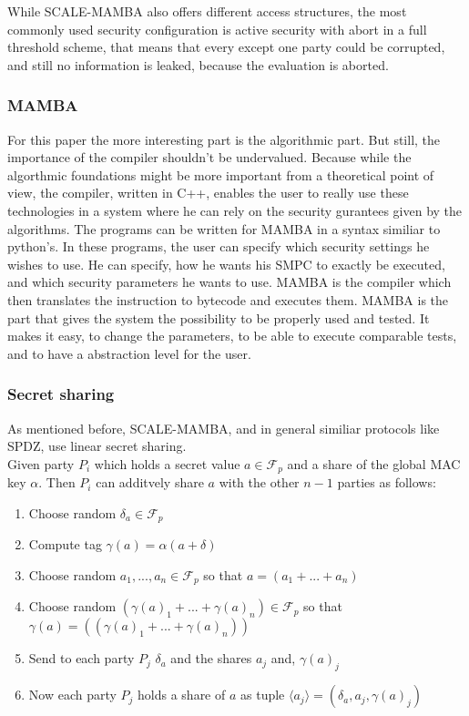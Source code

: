 \documentclass[english,runningheads,a4paper]{llncs}[2018/03/10]
\begin{document}
While SCALE-MAMBA also offers different access structures, the most commonly used security configuration is active security with abort in a full threshold scheme, that means that every except one party could be corrupted, and still no information is leaked, because the evaluation is aborted.

\subsubsection{MAMBA}
For this paper the more interesting part is the algorithmic part. But still, the importance of the compiler shouldn't be undervalued. Because while the algorthmic foundations might be more important from a theoretical point of view, the compiler, written in C++, enables the user to really use these technologies in a system where he can rely on the security gurantees given by the algorithms. The programs can be written for MAMBA in a syntax similiar to python's. In these programs, the user can specify which security settings he wishes to use. He can specify, how he wants his SMPC to exactly be executed, and which security parameters he wants to use. MAMBA is the compiler which then translates the instruction to bytecode and executes them. MAMBA is the part that gives the system the possibility to be properly used and tested. It makes it easy, to change the parameters, to be able to execute comparable tests, and to have a abstraction level for the user.\\




\subsubsection{Secret sharing}

As mentioned before, SCALE-MAMBA, and in general similiar protocols like SPDZ, use linear secret sharing.\\
Given party \(P_i\) which holds a secret value \( a \in \mathcal{F}_p\) and a share of the global MAC key \( \alpha\). Then \( P_i\) can additvely share \( a\) with the other \(n-1\) parties as follows:
\begin{enumerate}
\item Choose random \(\delta_a \in \mathcal{F}_p\)
\item Compute tag $ \gamma (a)= \alpha(a+\delta)$
\item Choose random \(a_1,...,a_n \in \mathcal{F}_p\) so that $ a=(a_1+...+a_n)$
\item Choose random \((\gamma (a)_1+...+\gamma (a)_n) \in \mathcal{F}_p\) so that $\gamma (a)=((\gamma (a)_1+...+\gamma (a)_n))$
\item Send to each party \( P_j \) \( \delta_a \) and the shares \(a_j \) and, \( \gamma (a)_j \)
\item Now each party \( P_j\) holds a share of \( a\) as tuple \(\langle a_j\rangle = (\delta_a,a_j,\gamma(a)_j )\)
\end{enumerate}
\end{document}
